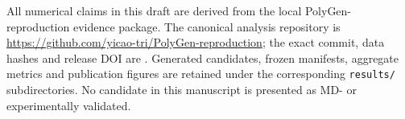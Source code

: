All numerical claims in this draft are derived from the local PolyGen-reproduction evidence package. The canonical analysis repository is \url{https://github.com/yicao-tri/PolyGen-reproduction}; the exact commit, data hashes and release DOI are . Generated candidates, frozen manifests, aggregate metrics and publication figures are retained under the corresponding \texttt{results/} subdirectories. No candidate in this manuscript is presented as MD- or experimentally validated.


